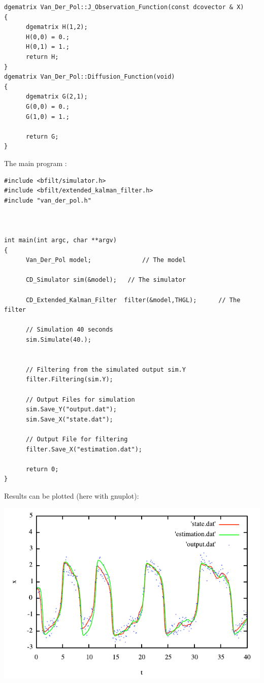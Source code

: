 \begin{Desc}
\begin{DocInclude}
\begin{verbatim}
dgematrix Van_Der_Pol::J_Observation_Function(const dcovector & X)
{
      dgematrix H(1,2);
      H(0,0) = 0.;
      H(0,1) = 1.;
      return H;
}
dgematrix Van_Der_Pol::Diffusion_Function(void)
{
      dgematrix G(2,1);
      G(0,0) = 0.;
      G(1,0) = 1.;

      return G;
}
\end{verbatim}
\end{DocInclude}
 The main program : 

\begin{DocInclude}\begin{verbatim}#include <bfilt/simulator.h>
#include <bfilt/extended_kalman_filter.h>
#include "van_der_pol.h"



int main(int argc, char **argv)
{
      Van_Der_Pol model;              // The model

      CD_Simulator sim(&model);   // The simulator
      
      CD_Extended_Kalman_Filter  filter(&model,THGL);      // The filter
      
      // Simulation 40 seconds
      sim.Simulate(40.);
        

      // Filtering from the simulated output sim.Y
      filter.Filtering(sim.Y);

      // Output Files for simulation
      sim.Save_Y("output.dat");
      sim.Save_X("state.dat");

      // Output File for filtering
      filter.Save_X("estimation.dat");
 
      return 0;
}
\end{verbatim}
\end{DocInclude}
 Results can be plotted (here with gnuplot):  \begin{ImageNoCaption}\mbox{\includegraphics{van_der_pol}}
\end{ImageNoCaption}
 \end{Desc}
